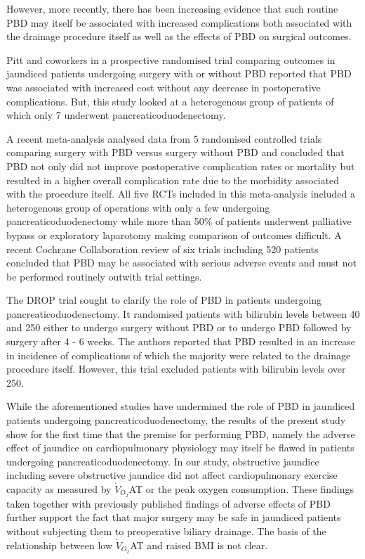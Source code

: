 However, more recently, there has been increasing evidence that such routine PBD may itself be associated with increased complications both associated with the drainage procedure itself as well as the effects of PBD on surgical outcomes.

Pitt and coworkers in a prospective randomised trial comparing outcomes in jaundiced patients undergoing surgery with or without PBD reported that PBD was associated with increased cost without any decrease in postoperative complications.\parencite{pitt_does_1985} But, this study looked at a heterogenous group of patients of which only 7 underwent pancreaticoduodenectomy.

A recent meta-analysis\parencite{sewnath_meta-analysis_2002} analysed data from 5 randomised controlled trials comparing surgery with PBD versus surgery without PBD and concluded that PBD not only did not improve postoperative complication rates or mortality but resulted in a higher overall complication rate due to the morbidity associated with the procedure itself. All five RCTs included in this meta-analysis included a heterogenous group of operations with only a few undergoing pancreaticoduodenectomy while more than 50\% of patients underwent palliative bypass or exploratory laparotomy making comparison of outcomes difficult. A recent Cochrane Collaboration review of six trials including 520 patients concluded that PBD may be associated with serious adverse events and must not be performed routinely outwith trial settings.\parencite{wang_preoperative_2008}

The DROP trial sought to clarify the role of PBD in patients undergoing pancreaticoduodenectomy.\parencite{van_der_gaag_preoperative_2010} It randomised patients with bilirubin levels between 40 and 250 either to undergo surgery without PBD or to undergo PBD followed by surgery after 4 - 6 weeks. The authors reported that PBD resulted in an increase in incidence of complications of which the majority were related to the drainage procedure itself. However, this trial excluded patients with bilirubin levels over 250.

While the aforementioned studies have undermined the role of PBD in jaundiced patients undergoing pancreaticoduodenectomy, the results of the present study show for the first time that the premise for performing PBD, namely the adverse effect of jaundice on cardiopulmonary physiology may itself be flawed in patients undergoing pancreaticoduodenectomy. In our study, obstructive jaundice including severe obstructive jaundice did not affect cardiopulmonary exercise capacity as measured by $\dot{V}_{O_2}$AT or the peak oxygen consumption. These findings taken together with previously published findings of adverse effects of PBD further support the fact that major surgery may be safe in jaundiced patients without subjecting them to preoperative biliary drainage. 
The basis of the relationship between low $\dot{V}_{O_2}$AT and raised BMI is not clear. 

